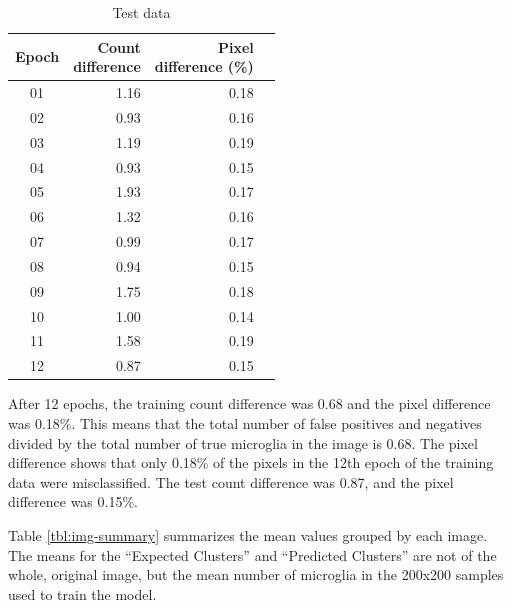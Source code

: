 \documentclass{article}
\begin{document}
\begin{table}[ht]
\begin{subtable}{0.5\textwidth}
  \end{subtable}%
  \begin{subtable}{0.5\textwidth}
    \caption{Test data}
    \begin{tabular}{crrr}
      \toprule
      Epoch & \shortstack{Count \\ difference} & \shortstack{Pixel \\ difference (\%)} \\
      \midrule
        01  &             1.16 &             0.18 \\
        02  &             0.93 &             0.16 \\
        03  &             1.19 &             0.19 \\
        04  &             0.93 &             0.15 \\
        05  &             1.93 &             0.17 \\
        06  &             1.32 &             0.16 \\
        07  &             0.99 &             0.17 \\
        08  &             0.94 &             0.15 \\
        09  &             1.75 &             0.18 \\
        10  &             1.00 &             0.14 \\
        11  &             1.58 &             0.19 \\
        12  &             0.87 &             0.15 \\
      \bottomrule
    \end{tabular}
  \end{subtable}
\end{table}

After 12 epochs, the training count difference was 0.68 and the pixel 
difference was 0.18\%. This means that the total number of false positives 
and negatives divided by the total number of true microglia in the image is 
0.68. The pixel difference shows that only 0.18\% of the pixels in the 12th 
epoch of the training data were misclassified. The test count difference was 
0.87, and the pixel difference was 0.15\%.

Table \ref{tbl:img-summary} summarizes the mean values grouped by each image. 
The means for the ``Expected Clusters'' and ``Predicted Clusters'' are not of 
the whole, original image, but the mean number of microglia in the 200x200 
samples used to train the model.
\end{document}
